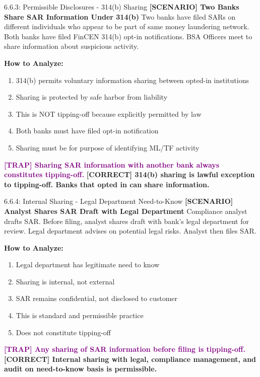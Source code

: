 \documentclass[11pt,a4paper]{beamer}
\newcommand{\trap}[1]{\textcolor{purple}{\textbf{[TRAP] #1}}}
\newcommand{\correct}[1]{\textcolor{green!50!black}{\textbf{[CORRECT] #1}}}
\newcommand{\scenario}[1]{\textcolor{blue!70!black}{\textbf{[SCENARIO] #1}}}
\begin{document}
\begin{frame}{6.6.3: Permissible Disclosures - 314(b) Sharing}
	\scenario{Two Banks Share SAR Information Under 314(b)}
	Two banks have filed SARs on different individuals who appear to be part of same money laundering network. Both banks have filed FinCEN 314(b) opt-in notifications. BSA Officers meet to share information about suspicious activity.
	
	\vspace{0.1cm}
	\textbf{How to Analyze:}
	\begin{enumerate}
		\item 314(b) permits voluntary information sharing between opted-in institutions
		\item Sharing is protected by safe harbor from liability
		\item This is NOT tipping-off because explicitly permitted by law
		\item Both banks must have filed opt-in notification
		\item Sharing must be for purpose of identifying ML/TF activity
	\end{enumerate}
	\trap{Sharing SAR information with another bank always constitutes tipping-off.}
	\correct{314(b) sharing is lawful exception to tipping-off. Banks that opted in can share information.}
\end{frame}

\begin{frame}{6.6.4: Internal Sharing - Legal Department Need-to-Know}
	\scenario{Analyst Shares SAR Draft with Legal Department}
	Compliance analyst drafts SAR. Before filing, analyst shares draft with bank's legal department for review. Legal department advises on potential legal risks. Analyst then files SAR.
	
	\vspace{0.1cm}
	\textbf{How to Analyze:}
	\begin{enumerate}
		\item Legal department has legitimate need to know
		\item Sharing is internal, not external
		\item SAR remains confidential, not disclosed to customer
		\item This is standard and permissible practice
		\item Does not constitute tipping-off
	\end{enumerate}
	\trap{Any sharing of SAR information before filing is tipping-off.}
	\correct{Internal sharing with legal, compliance management, and audit on need-to-know basis is permissible.}
\end{frame}
\end{document}
